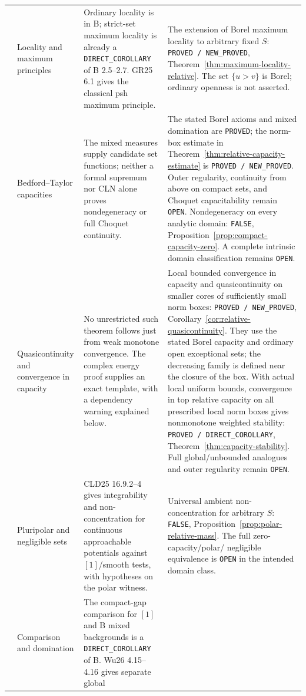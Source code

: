 \documentclass[11pt,a4paper]{article}
\numberwithin{equation}{section}
\theoremstyle{definition}
\theoremstyle{remark}
\begin{document}
\begin{longtable}{@{}>{\raggedright\arraybackslash}p{}>{\raggedright\arraybackslash}p{}>{\raggedright\arraybackslash}p{}>{\raggedright\arraybackslash}p{}@{}}
5 & Locality and maximum principles &
Ordinary locality is in B; strict-set maximum locality is already a
\texttt{DIRECT\_COROLLARY} of B 2.5--2.7. GR25 6.1 gives the classical
psh maximum principle. &
The extension of Borel maximum locality to arbitrary fixed \(S\):
\texttt{PROVED / NEW\_PROVED},
Theorem~\ref{thm:maximum-locality-relative}. The set \(\{u>v\}\) is Borel;
ordinary openness is not asserted.\\[3pt]
6 & Bedford--Taylor capacities &
The mixed measures supply candidate set functions; neither a formal
supremum nor CLN alone proves nondegeneracy or full Choquet continuity. &
The stated Borel axioms and mixed domination are \texttt{PROVED}; the
norm-box estimate in Theorem~\ref{thm:relative-capacity-estimate} is
\texttt{PROVED / NEW\_PROVED}. Outer regularity, continuity from above
on compact sets, and Choquet capacitability remain \texttt{OPEN}.
Nondegeneracy on every analytic domain: \texttt{FALSE},
Proposition~\ref{prop:compact-capacity-zero}. A complete intrinsic domain
classification remains \texttt{OPEN}.\\[3pt]
7 & Quasicontinuity and convergence in capacity &
No unrestricted such theorem follows just from weak monotone convergence.
The complex energy proof supplies an exact template, with a dependency
warning explained below. &
Local bounded convergence in capacity and quasicontinuity on smaller
cores of sufficiently small norm boxes:
\texttt{PROVED / NEW\_PROVED}, Corollary~\ref{cor:relative-quasicontinuity}.
They use the stated Borel capacity and ordinary open exceptional sets;
the decreasing family is defined near the closure of the box.
With actual local uniform bounds, convergence in top relative capacity
on all prescribed local norm boxes gives nonmonotone weighted stability:
\texttt{PROVED / DIRECT\_COROLLARY},
Theorem~\ref{thm:capacity-stability}.
Full global/unbounded analogues and outer regularity remain \texttt{OPEN}.\\[3pt]
8 & Pluripolar and negligible sets &
CLD25 16.9.2--4 gives integrability and non-concentration for continuous
approachable potentials against \([1]\)/smooth tests, with hypotheses on
the polar witness. &
Universal ambient non-concentration for arbitrary \(S\): \texttt{FALSE},
Proposition~\ref{prop:polar-relative-mass}. The full zero-capacity/polar/
negligible equivalence is \texttt{OPEN} in the intended domain class.\\[3pt]
9 & Comparison and domination &
The compact-gap comparison for \([1]\) and B mixed backgrounds is a
\texttt{DIRECT\_COROLLARY} of B. Wu26 4.15--4.16 gives separate global

\end{longtable}
\end{document}
